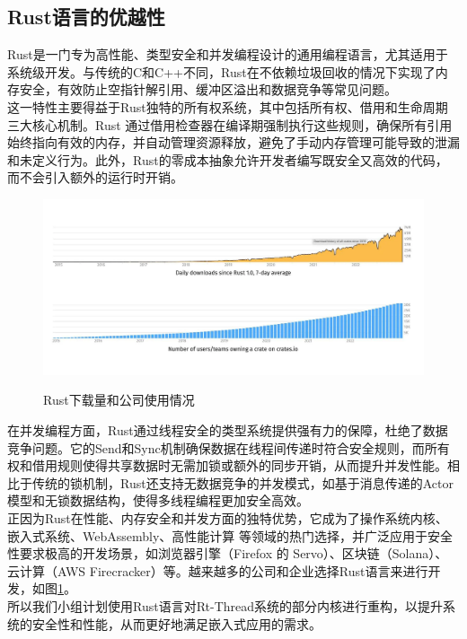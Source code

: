 \subsection{Rust语言的优越性}
\indent Rust是一门专为高性能、类型安全和并发编程设计的通用编程语言，尤其适用于系统级开发。与传统的C和C++不同，Rust在不依赖垃圾回收的情况下实现了内存安全，有效防止空指针解引用、缓冲区溢出和数据竞争等常见问题。\\
\indent 这一特性主要得益于Rust独特的所有权系统，其中包括所有权、借用和生命周期三大核心机制。Rust 通过借用检查器在编译期强制执行这些规则，确保所有引用始终指向有效的内存，并自动管理资源释放，避免了手动内存管理可能导致的泄漏和未定义行为。此外，Rust的零成本抽象允许开发者编写既安全又高效的代码，而不会引入额外的运行时开销。\\
\begin{figure}[htpb]
    \centering
    \caption{Rust下载量和公司使用情况}
    \includegraphics[width=1\linewidth]{img/lib-rs-stats-rust-downloads-users.jpg}
    \label{fig1}
\end{figure}

\indent 在并发编程方面，Rust通过线程安全的类型系统提供强有力的保障，杜绝了数据竞争问题。它的Send和Sync机制确保数据在线程间传递时符合安全规则，而所有权和借用规则使得共享数据时无需加锁或额外的同步开销，从而提升并发性能。相比于传统的锁机制，Rust还支持无数据竞争的并发模式，如基于消息传递的Actor模型和无锁数据结构，使得多线程编程更加安全高效。\\
\indent 正因为Rust在性能、内存安全和并发方面的独特优势，它成为了操作系统内核、嵌入式系统、WebAssembly、高性能计算 等领域的热门选择，并广泛应用于安全性要求极高的开发场景，如浏览器引擎（Firefox 的 Servo）、区块链（Solana）、云计算（AWS Firecracker）等。越来越多的公司和企业选择Rust语言来进行开发，如图\ref{fig1}。\\
\indent 所以我们小组计划使用Rust语言对Rt-Thread系统的部分内核进行重构，以提升系统的安全性和性能，从而更好地满足嵌入式应用的需求。\\


